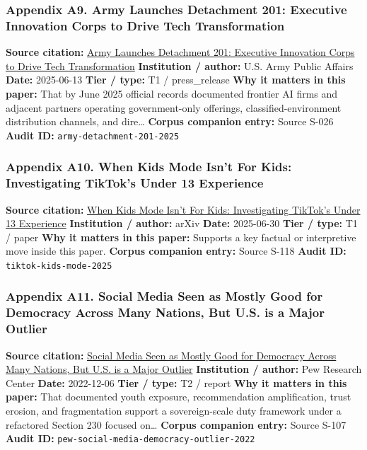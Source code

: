 \documentclass[
  american,
  11pt,
  letterpaper,
]{article}
\begin{document}
\subsubsection{Appendix A9. Army Launches Detachment 201: Executive
Innovation Corps to Drive Tech
Transformation}\label{appendix-a9-army-launches-detachment-201-executive-innovation-corps-to-drive-tech-transformation}

\textbf{Source citation:}
\href{https://www.army.mil/article/286317/army_launches_detachment_201_executive_innovation_corps_to_drive_tech_transformation}{Army
Launches Detachment 201: Executive Innovation Corps to Drive Tech
Transformation} \textbf{Institution / author:} U.S. Army Public Affairs
\textbf{Date:} 2025-06-13 \textbf{Tier / type:} T1 / press\_release
\textbf{Why it matters in this paper:} That by June 2025 official
records documented frontier AI firms and adjacent partners operating
government-only offerings, classified-environment distribution channels,
and dire\ldots{} \textbf{Corpus companion entry:} Source S-026
\textbf{Audit ID:} \texttt{army-detachment-201-2025}

\subsubsection{Appendix A10. When Kids Mode Isn't For Kids:
Investigating TikTok's Under 13
Experience}\label{appendix-a10-when-kids-mode-isn-t-for-kids-investigating-tiktok-s-under-13-experience}

\textbf{Source citation:} \href{https://arxiv.org/abs/2507.00299}{When
Kids Mode Isn't For Kids: Investigating TikTok's Under 13 Experience}
\textbf{Institution / author:} arXiv \textbf{Date:} 2025-06-30
\textbf{Tier / type:} T1 / paper \textbf{Why it matters in this paper:}
Supports a key factual or interpretive move inside this paper.
\textbf{Corpus companion entry:} Source S-118 \textbf{Audit ID:}
\texttt{tiktok-kids-mode-2025}

\subsubsection{Appendix A11. Social Media Seen as Mostly Good for
Democracy Across Many Nations, But U.S. is a Major
Outlier}\label{appendix-a11-social-media-seen-as-mostly-good-for-democracy-across-many-nations-but-u-s-is-a-major-outlier}

\textbf{Source citation:}
\href{https://www.pewresearch.org/global/2022/12/06/social-media-seen-as-mostly-good-for-democracy-across-many-nations-but-u-s-is-a-major-outlier/}{Social
Media Seen as Mostly Good for Democracy Across Many Nations, But U.S. is
a Major Outlier} \textbf{Institution / author:} Pew Research Center
\textbf{Date:} 2022-12-06 \textbf{Tier / type:} T2 / report \textbf{Why
it matters in this paper:} That documented youth exposure,
recommendation amplification, trust erosion, and fragmentation support a
sovereign-scale duty framework under a refactored Section 230 focused
on\ldots{} \textbf{Corpus companion entry:} Source S-107 \textbf{Audit
ID:} \texttt{pew-social-media-democracy-outlier-2022}
\end{document}
